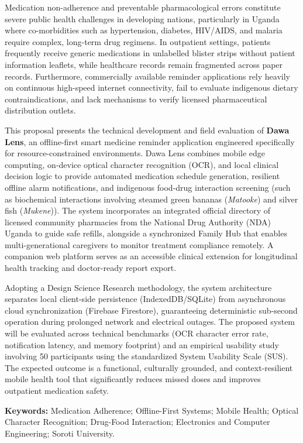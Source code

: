 \documentclass[proposal,openany]{sotuthesis}
\title{\@reporttitle}
\author{\@studentname}
\date{\@submissiondate}
\begin{document}
\makecoverpage
\maketitlepage

\frontmatterstart
\makedeclaration
\makeapproval

\begin{thesisabstract}
Medication non-adherence and preventable pharmacological errors constitute severe public health challenges in developing nations, particularly in Uganda where co-morbidities such as hypertension, diabetes, HIV/AIDS, and malaria require complex, long-term drug regimens. In outpatient settings, patients frequently receive generic medications in unlabelled blister strips without patient information leaflets, while healthcare records remain fragmented across paper records. Furthermore, commercially available reminder applications rely heavily on continuous high-speed internet connectivity, fail to evaluate indigenous dietary contraindications, and lack mechanisms to verify licensed pharmaceutical distribution outlets.

This proposal presents the technical development and field evaluation of \textbf{Dawa Lens}, an offline-first smart medicine reminder application engineered specifically for resource-constrained environments. Dawa Lens combines mobile edge computing, on-device optical character recognition (OCR), and local clinical decision logic to provide automated medication schedule generation, resilient offline alarm notifications, and indigenous food-drug interaction screening (such as biochemical interactions involving steamed green bananas (\textit{Matooke}) and silver fish (\textit{Mukene})). The system incorporates an integrated official directory of licensed community pharmacies from the National Drug Authority (NDA) Uganda to guide safe refills, alongside a synchronized Family Hub that enables multi-generational caregivers to monitor treatment compliance remotely. A companion web platform serves as an accessible clinical extension for longitudinal health tracking and doctor-ready report export.

Adopting a Design Science Research methodology, the system architecture separates local client-side persistence (IndexedDB/SQLite) from asynchronous cloud synchronization (Firebase Firestore), guaranteeing deterministic sub-second operation during prolonged network and electrical outages. The proposed system will be evaluated across technical benchmarks (OCR character error rate, notification latency, and memory footprint) and an empirical usability study involving 50 participants using the standardized System Usability Scale (SUS). The expected outcome is a functional, culturally grounded, and context-resilient mobile health tool that significantly reduces missed doses and improves outpatient medication safety.

\vspace{0.5cm}
\noindent\textbf{Keywords:} Medication Adherence; Offline-First Systems; Mobile Health; Optical Character Recognition; Drug-Food Interaction; Electronics and Computer Engineering; Soroti University.
\end{thesisabstract}
\end{document}
